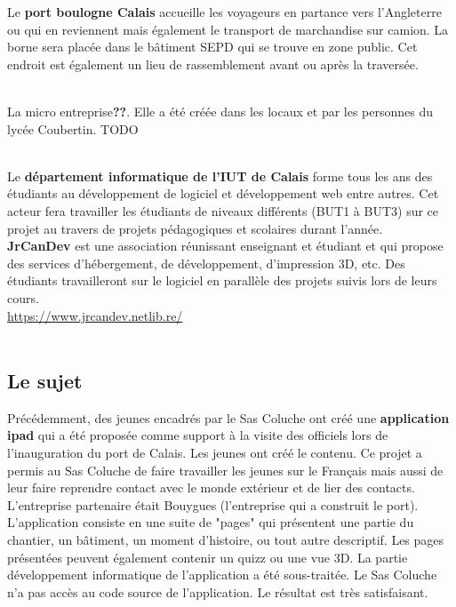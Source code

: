 \documentclass[11pt]{article}
\begin{document}
Le \textbf{port boulogne Calais} accueille les voyageurs en partance vers l'Angleterre ou qui en reviennent mais également le transport de marchandise sur camion. La borne sera placée dans le bâtiment SEPD qui se trouve en zone public. Cet endroit est également un lieu de rassemblement avant ou après la traversée.\\~

La micro entreprise\textbf{??}. Elle a été créée dans les locaux et par les personnes du lycée Coubertin. TODO\\~

Le \textbf{département informatique de l'IUT de Calais} forme tous les ans des étudiants au développement de logiciel et développement web entre autres. Cet acteur fera travailler les étudiants de niveaux différents (BUT1 à BUT3) sur ce projet au travers de projets pédagogiques et scolaires durant l'année.\\
\textbf{JrCanDev} est une association réunissant enseignant et étudiant et qui propose des services d'hébergement, de développement, d'impression 3D, etc. Des étudiants travailleront sur le logiciel en parallèle des projets suivis lors de leurs cours.\\\url{https://www.jrcandev.netlib.re/}\\~
 
 \subsection{Le sujet}
Précédemment, des jeunes encadrés par le Sas Coluche ont créé une \textbf{application ipad} qui a été proposée comme support à la visite des officiels lors de l'inauguration du port de Calais. Les jeunes ont créé le contenu. Ce projet a permis au Sas Coluche de faire travailler les jeunes sur le Français mais aussi de leur faire reprendre contact avec le monde extérieur et de lier des contacts.\\ L'entreprise partenaire était Bouygues (l'entreprise qui a construit le port).\\

L'application consiste en une suite de "pages" qui présentent une partie du chantier, un bâtiment, un moment d'histoire, ou tout autre descriptif. Les pages présentées peuvent également contenir un quizz ou une vue 3D. La partie développement informatique de l'application a été sous-traitée. Le Sas Coluche n'a pas accès au code source de l'application. Le résultat est très satisfaisant.\\
\end{document}
